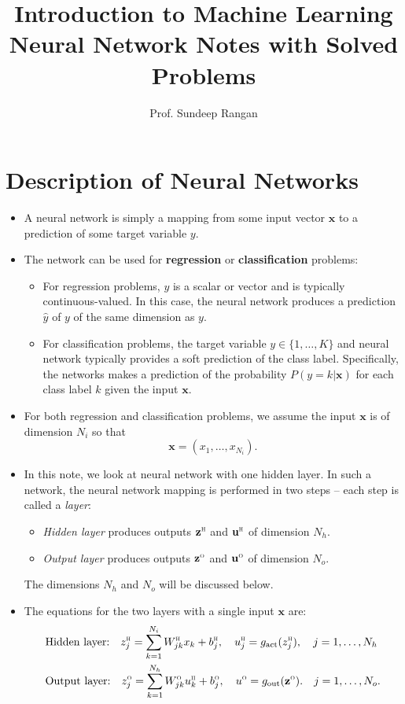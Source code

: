\documentclass[11pt]{article}
\newcommand{\ubf}{\mathbf{u}}
\newcommand{\xbf}{\mathbf{x}}
\newcommand{\zbf}{\mathbf{z}}
\def\hid{\textsc{\tiny H}}
\def\out{\textsc{\tiny O}}
\begin{document}
\title{Introduction to Machine Learning\\
Neural Network Notes with Solved Problems}
\author{Prof. Sundeep Rangan}
\date{}

\maketitle

\section{Description of Neural Networks}
\begin{itemize}
\item A neural network is simply a mapping from some input vector $\xbf$ to 
a prediction of some target variable $y$.  
\item The network can be used for \textbf{regression} or \textbf{classification} problems:
\begin{itemize}
\item For regression problems, $y$ is a scalar or vector and is typically continuous-valued.
In this case, the neural network produces a prediction $\hat{y}$ of $y$ of the same dimension as $y$.
\item For classification problems, the target variable $y \in \{1,\ldots,K\}$ and neural network
typically provides a soft prediction of the class label.
Specifically, the networks makes a prediction of the probability $P(y=k|\xbf)$ for each class label $k$
given the input $\xbf$.
\end{itemize}
\item For both regression and classification problems,
we assume the input $\xbf$ is of dimension $N_i$ so that
\[
    \xbf = (x_1,\ldots,x_{N_i}).
\]

\item In this note, we look at neural network with one hidden layer.
In such a network, the neural network mapping is performed in two steps -- each step is called a \emph{layer}:
\begin{itemize}
\item \emph{Hidden layer} produces outputs $\zbf^\hid$ and $\ubf^\hid$ of dimension $N_h$.
\item \emph{Output layer} produces outputs $\zbf^\out$ and $\ubf^\out$ of dimension $N_o$.
\end{itemize}
The dimensions $N_h$ and $N_o$ will be discussed below.

\item The equations for the two layers with a single input $\xbf$ are:
\begin{subequations} \label{eq:nn}
\begin{align}
    &\mbox{Hidden layer:} \quad
    z_{j}^\hid = \sum_{k=1}^{N_i} W^\hid_{jk}x_{k} + b^\hid_j, \quad
    u_{j}^\hid = g_{\rm act}(z_{j}^\hid), \quad j=1,\ldots,N_h
    \label{eq:nnhidden} \\
    &\mbox{Output layer:} \quad
    z_{j}^\out = \sum_{k=1}^{N_h} W^\out_{jk}u^\hid_{k} + b^\out_j,
    \quad 
    u^\out = g_{\rm out}(\zbf^\out).
    \quad j=1,\ldots,N_o.
    \label{eq:nnout}
\end{align}
\end{subequations}


\end{itemize}
\end{document}
